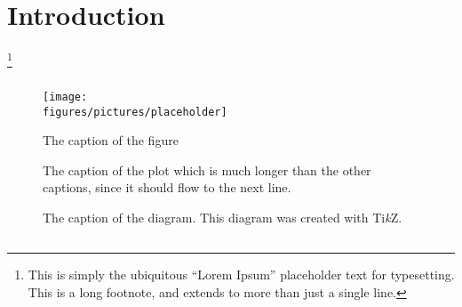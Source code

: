 \documentclass[\main/ExampleThesis]{subfiles}
\begin{document}
\chapter{Introduction}
\label{ch:introduction}

\lipsum[1]%
\footnote{This is simply the ubiquitous ``Lorem Ipsum'' placeholder text for typesetting. This is a long footnote, and extends to more than just a single line.}

\section{\lipsum[150][1-3]}

\lipsum[2]

\begin{figure}[tbp]
  \centering
  \texttt{[image: \\figures/pictures/placeholder]}
  \caption{The caption of the figure}
  \label{fig:placeholder1}
\end{figure}

\begin{figure}[tbp]
  \centering
  \caption{The caption of the plot which is much longer than the other captions, since it should flow to the next line.}
  \label{fig:placeholder2}
\end{figure}

\begin{figure}[tbp]
  \centering
  \caption{The caption of the diagram. This diagram was created with Ti\emph{k}Z.}
  \label{fig:placeholder3}
\end{figure}

\section{\lipsum[150][4]}

\subsection{\lipsum[150][8]}

\lipsum[3]


 \cite{einstein, latexcompanion, knuthwebsite}
\end{document}
